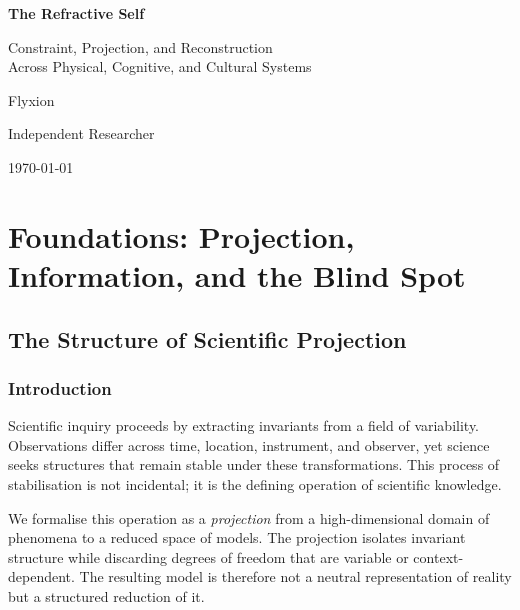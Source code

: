 \documentclass[11pt,openany]{book}
\begin{document}
\frontmatter

\begin{titlepage}
\centering
\vspace*{3cm}
{\Huge\bfseries The Refractive Self\par}
\vspace{1cm}
{\Large Constraint, Projection, and Reconstruction\\
Across Physical, Cognitive, and Cultural Systems\par}
\vspace{2cm}
{\large Flyxion\par}
{\normalsize Independent Researcher\par}
\vfill
{\large \today\par}
\end{titlepage}

\tableofcontents
\listoftheorems[ignoreall, show={theorem,proposition,corollary,definition}]

\mainmatter

\part{Foundations: Projection, Information, and the Blind Spot}

\chapter{The Structure of Scientific Projection}
\label{ch:projection}

\section{Introduction}
\label{sec:introduction-projection}

Scientific inquiry proceeds by extracting invariants from a
field of variability. Observations differ across time,
location, instrument, and observer, yet science seeks
structures that remain stable under these transformations.
This process of stabilisation is not incidental; it is the
defining operation of scientific knowledge.

We formalise this operation as a \emph{projection} from a
high-dimensional domain of phenomena to a reduced space of
models. The projection isolates invariant structure while
discarding degrees of freedom that are variable or
context-dependent. The resulting model is therefore not a
neutral representation of reality but a structured reduction
of it.
\end{document}
